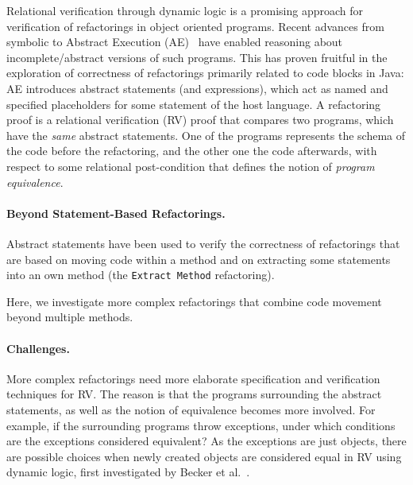 
Relational verification through dynamic logic is a promising approach for verification of refactorings in object oriented programs.
Recent advances from symbolic to Abstract Execution (AE)~\cite{DBLP:conf/fm/SteinhofelH19} have enabled reasoning about incomplete/abstract versions of such programs.
This has proven fruitful in the exploration of correctness of refactorings primarily related to code blocks in Java:
%
AE introduces abstract statements (and expressions), which act as named and specified placeholders for some statement of the host language.
A refactoring proof is a relational verification (RV) proof that compares two programs, which have the \emph{same} abstract statements. One of the programs represents the schema of the code before the refactoring, and the other one the code afterwards, with respect to some relational post-condition that defines the notion of \emph{program equivalence}.

\paragraph{Beyond Statement-Based Refactorings.}
Abstract statements have been used to verify the correctness of refactorings that are based on moving code within a method and on extracting some statements into an own method (the \texttt{Extract Method} refactoring). 


Here, we investigate more complex refactorings that combine code movement beyond multiple methods. 


\paragraph{Challenges.}
More complex refactorings need more elaborate specification and verification techniques for RV. 
The reason is that the programs surrounding the abstract statements, as well as the notion of equivalence becomes more involved.
For example, if the surrounding programs throw exceptions, under which conditions are the exceptions considered equivalent? 
As the exceptions are just objects, there are possible choices when newly created objects are considered equal in RV using dynamic logic, 
first investigated by Becker et al.~\cite{DBLP:conf/lopstr/BeckertBKSSU13}.



